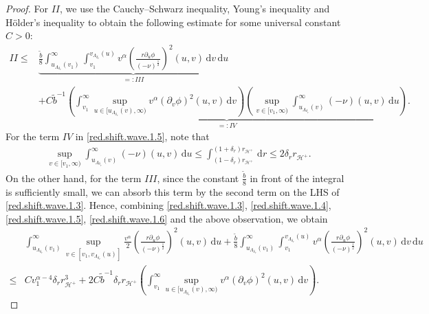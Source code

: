 \documentclass[10pt, reqno]{amsart}
\theoremstyle{definition}
\theoremstyle{remark}
\theoremstyle{conjecture}
\numberwithin{equation}{section}
\newcommand{\ud}{\mathrm{d}}
\newcommand{\rd}{\partial}
\newcommand{\0}{\emptyset}
\newcommand{\alp}{\alpha}
\newcommand{\calH}{\mathcal H}
\newcommand{\f}{\frac}
\newcommand{\de}{\delta}
\newcommand{\EH}{\calH^{+}}
\begin{document}
\begin{proof}
For $II$, we use the Cauchy--Schwarz inequality, Young's inequality and H\"older's inequality to obtain the following estimate for some universal constant $C>0$:
\begin{equation}\label{red.shift.wave.1.5}
\begin{split}
II\leq &\underbrace{\f {\tilde{b}}8\int_{u_{\Lambda_{\de_r}}(v_1)}^\infty\int_{v_1}^{v_{\Lambda_{\de_r}}(u)}  v^{\alp}\left(\f{r\rd_u\phi}{(-\nu)^{\f 12}}\right)^2(u,v)\,\ud v\, \ud u}_{=:III} \\
&+\underbrace{C \tilde{b}^{-1}\left(\int_{v_1}^{\infty} \sup_{u\in [u_{\Lambda_{\de_r}}(v),\infty)} v^{\alp}(\rd_v\phi)^2 (u,v)\, \ud v\right) \left(\sup_{v\in [v_1,\infty)}\int_{u_{\Lambda_{\de_r}}(v)}^\infty (-\nu) (u,v)\, \ud u\right)}_{=:IV}.
\end{split}
\end{equation}
For the term $IV$ in \eqref{red.shift.wave.1.5}, note that
\begin{equation}\label{red.shift.wave.1.6}
\begin{split}
\sup_{v\in [v_1,\infty)}\int_{u_{\Lambda_{\de_r}}(v)}^\infty (-\nu) (u,v)\, \ud u\leq \int_{(1-{\de_r})r_{\EH}}^{(1+{\de_r})r_{\EH}} \, \ud r\leq 2{\de_r} r_{\EH}.
\end{split}
\end{equation}
On the other hand, for the term $III$, since the constant $\f{\tilde{b}}{8}$ in front of the integral is sufficiently small, we can absorb this term by the second term on the LHS of \eqref{red.shift.wave.1.3}. Hence, combining \eqref{red.shift.wave.1.3}, \eqref{red.shift.wave.1.4}, \eqref{red.shift.wave.1.5}, \eqref{red.shift.wave.1.6} and the above observation, we obtain 
\begin{equation}\label{red.shift.wave.1.7}
\begin{split}
&\int_{u_{\Lambda_{\de_r}}(v_1)}^\infty\sup_{v\in [v_1, v_{\Lambda_{\de_r}}(u)]}\f {v^{\alp}}2 \left(\f{r\rd_u\phi}{(-\nu)^{\f 12}}\right)^2(u,v)\, \ud u
+\f {\tilde{b}}8 \int_{u_{\Lambda_{\de_r}}(v_1)}^\infty\int_{v_1}^{v_{\Lambda_{\de_r}}(u)}  v^{\alp}\left(\f{r\rd_u\phi}{(-\nu)^{\f 12}}\right)^2(u,v)\,\ud v\, \ud u\\
\leq & C v_1^{\alp-4}{\de_r} r_{\EH}^3+ 2C \tilde{b}^{-1} {\de_r} r_{\EH}\left(\int_{v_1}^{\infty} \sup_{u\in [u_{\Lambda_{\de_r}}(v),\infty)} v^{\alp}(\rd_v\phi)^2 (u,v)\, \ud v\right).
\end{split}
\end{equation}


\end{proof}
\end{document}
